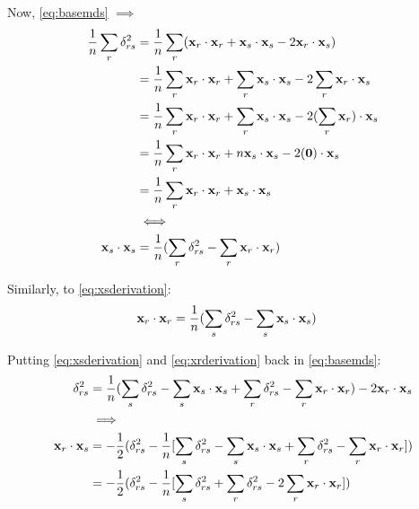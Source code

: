 Now, \ref{eq:basemds} $\implies$
\begin{align}
\label{eq:xsderivation}
\begin{split}
\frac{1}{n} \sum_r \delta_{rs}^2
&= \frac{1}{n} \sum_r (\mathbf{x}_r \cdot \mathbf{x}_r + \mathbf{x}_s\cdot \mathbf{x}_s -2 \mathbf{x}_r\cdot \mathbf{x}_s) \\
&= \frac{1}{n} \sum_r \mathbf{x}_r\cdot \mathbf{x}_r + \sum_r \mathbf{x}_s\cdot \mathbf{x}_s -2 \sum_r \mathbf{x}_r \cdot \mathbf{x}_s \\
&= \frac{1}{n} \sum_r \mathbf{x}_r\cdot \mathbf{x}_r + \sum_r \mathbf{x}_s\cdot \mathbf{x}_s -2 (\sum_r \mathbf{x}_r) \cdot \mathbf{x}_s \\
&= \frac{1}{n} \sum_r \mathbf{x}_r\cdot \mathbf{x}_r + n \mathbf{x}_s\cdot \mathbf{x}_s -2 (\mathbf{0}) \cdot \mathbf{x}_s \\
&= \frac{1}{n} \sum_r \mathbf{x}_r\cdot \mathbf{x}_r + \mathbf{x}_s\cdot \mathbf{x}_s \\
&\iff \\
\mathbf{x}_s\cdot \mathbf{x}_s &= \frac{1}{n} (\sum_r \delta_{rs}^2 - \sum_r \mathbf{x}_r \cdot \mathbf{x}_r)
\end{split}
\end{align}

Similarly, to \ref{eq:xsderivation}:
\begin{align}
\label{eq:xrderivation}
\begin{split}
\mathbf{x}_r\cdot \mathbf{x}_r &= \frac{1}{n} (\sum_s \delta_{rs}^2 - \sum_s \mathbf{x}_s \cdot \mathbf{x}_s)
\end{split}
\end{align}

Putting \ref{eq:xsderivation} and \ref{eq:xrderivation} back in \ref{eq:basemds}:
\begin{align}
\label{eq:xrsderivation}
\begin{split}
\delta_{rs}^2 &= \frac{1}{n} (\sum_s \delta_{rs}^2 - \sum_s \mathbf{x}_s \cdot \mathbf{x}_s + \sum_r \delta_{rs}^2 - \sum_r \mathbf{x}_r \cdot \mathbf{x}_r) -2 \mathbf{x}_r \cdot \mathbf{x}_s \\
&\implies \\
\mathbf{x}_r\cdot \mathbf{x}_s &= -\frac{1}{2} (\delta_{rs}^2 - \frac{1}{n} [\sum_s \delta_{rs}^2 - \sum_s \mathbf{x}_s \cdot \mathbf{x}_s + \sum_r \delta_{rs}^2 - \sum_r \mathbf{x}_r \cdot \mathbf{x}_r])\\
&= -\frac{1}{2} (\delta_{rs}^2 - \frac{1}{n} [\sum_s \delta_{rs}^2 + \sum_r \delta_{rs}^2 - 2\sum_r \mathbf{x}_r \cdot \mathbf{x}_r])\\
\end{split}
\end{align}


